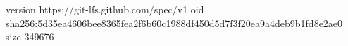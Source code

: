 version https://git-lfs.github.com/spec/v1
oid sha256:5d35ea4606bee8365fea2f6b60c1988df450d5d7f3f20ea9a4deb9b1fd8e2ae0
size 349676
